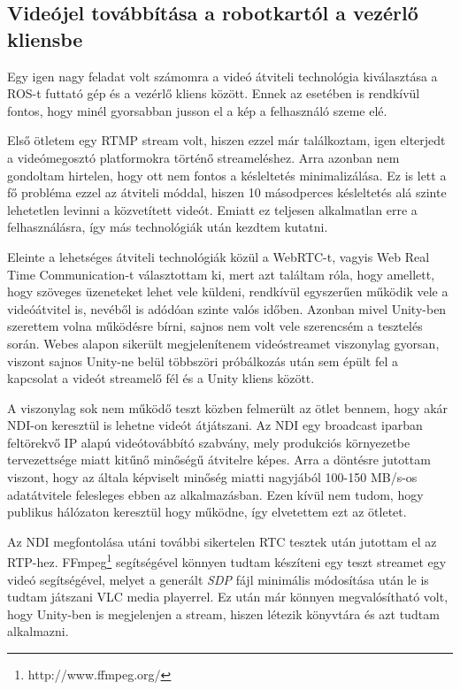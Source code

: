 \documentclass[11pt,a4paper,oneside]{article}
\begin{document}
\subsection{Videójel továbbítása a robotkartól a vezérlő kliensbe}

Egy igen nagy feladat volt számomra a videó átviteli technológia kiválasztása a ROS-t futtató gép és a vezérlő kliens között. Ennek az esetében is rendkívül fontos, hogy minél gyorsabban jusson el a kép a felhasználó szeme elé.

Első ötletem egy RTMP stream volt, hiszen ezzel már találkoztam, igen elterjedt a videómegosztó platformokra történő streameléshez. Arra azonban nem gondoltam hirtelen, hogy ott nem fontos a késleltetés minimalizálása. Ez is lett a fő probléma ezzel az átviteli móddal, hiszen 10 másodperces késleltetés alá szinte lehetetlen levinni a közvetített videót. Emiatt ez teljesen alkalmatlan erre a felhasználásra, így más technológiák után kezdtem kutatni.

Eleinte a lehetséges átviteli technológiák közül a WebRTC-t, vagyis Web Real Time Communication-t választottam ki, mert azt találtam róla, hogy amellett, hogy szöveges üzeneteket lehet vele küldeni, rendkívül egyszerűen működik vele a videóátvitel is, nevéből is adódóan szinte valós időben. Azonban mivel Unity-ben szerettem volna működésre bírni, sajnos nem volt vele szerencsém a tesztelés során. Webes alapon sikerült megjelenítenem videóstreamet viszonylag gyorsan, viszont sajnos Unity-ne belül többszöri próbálkozás után sem épült fel a kapcsolat a videót streamelő fél és a Unity kliens között.

A viszonylag sok nem működő teszt közben felmerült az ötlet bennem, hogy akár NDI-on keresztül is lehetne videót átjátszani. Az NDI egy broadcast iparban feltörekvő IP alapú videótovábbító szabvány, mely produkciós környezetbe tervezettsége miatt kitűnő minőségű átvitelre képes. Arra a döntésre jutottam viszont, hogy az általa képviselt minőség miatti nagyjából 100-150 MB/s-os adatátvitele felesleges ebben az alkalmazásban. Ezen kívül nem tudom, hogy publikus hálózaton keresztül hogy működne, így elvetettem ezt az ötletet.

Az NDI megfontolása utáni további sikertelen RTC tesztek után jutottam el az RTP-hez. FFmpeg\footnote{http://www.ffmpeg.org/} segítségével könnyen tudtam készíteni egy teszt streamet egy videó segítségével, melyet a generált \textit{SDP} fájl minimális módosítása után le is tudtam játszani VLC media playerrel. Ez után már könnyen megvalósítható volt, hogy Unity-ben is megjelenjen a stream, hiszen létezik könyvtára és azt tudtam alkalmazni.
\end{document}
